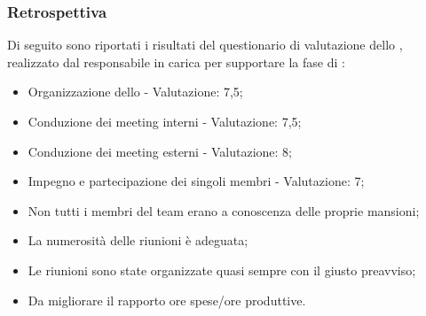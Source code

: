 \subsubsection{Retrospettiva}
\par Di seguito sono riportati i risultati del questionario di valutazione dello , realizzato dal responsabile in carica per supportare la fase di :
\begin{itemize}
  \item Organizzazione dello  - Valutazione: 7,5;
  \item Conduzione dei meeting interni - Valutazione: 7,5;
  \item Conduzione dei meeting esterni - Valutazione: 8;
  \item Impegno e partecipazione dei singoli membri - Valutazione: 7;
  \item Non tutti i membri del team erano a conoscenza delle proprie mansioni;
  \item La numerosità delle riunioni è adeguata;
  \item Le riunioni sono state organizzate quasi sempre con il giusto preavviso;
  \item Da migliorare il rapporto ore spese/ore produttive.
\end{itemize}

